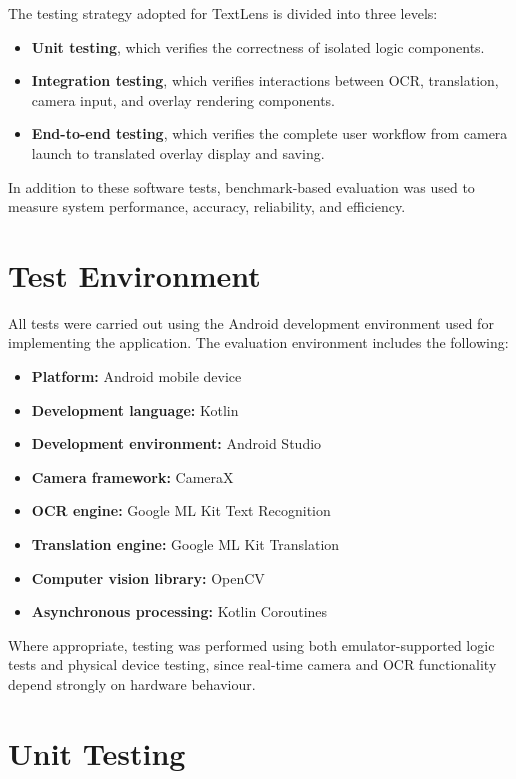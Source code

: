 The testing strategy adopted for TextLens is divided into three levels:

\begin{itemize}
    \item \textbf{Unit testing}, which verifies the correctness of isolated logic components.
    \item \textbf{Integration testing}, which verifies interactions between OCR, translation, camera input, and overlay rendering components.
    \item \textbf{End-to-end testing}, which verifies the complete user workflow from camera launch to translated overlay display and saving.
\end{itemize}

In addition to these software tests, benchmark-based evaluation was used to measure system performance, accuracy, reliability, and efficiency.

\section{Test Environment}

All tests were carried out using the Android development environment used for implementing the application. The evaluation environment includes the following:

\begin{itemize}
    \item \textbf{Platform:} Android mobile device
    \item \textbf{Development language:} Kotlin
    \item \textbf{Development environment:} Android Studio
    \item \textbf{Camera framework:} CameraX
    \item \textbf{OCR engine:} Google ML Kit Text Recognition
    \item \textbf{Translation engine:} Google ML Kit Translation
    \item \textbf{Computer vision library:} OpenCV
    \item \textbf{Asynchronous processing:} Kotlin Coroutines
\end{itemize}

Where appropriate, testing was performed using both emulator-supported logic tests and physical device testing, since real-time camera and OCR functionality depend strongly on hardware behaviour.

\section{Unit Testing}

